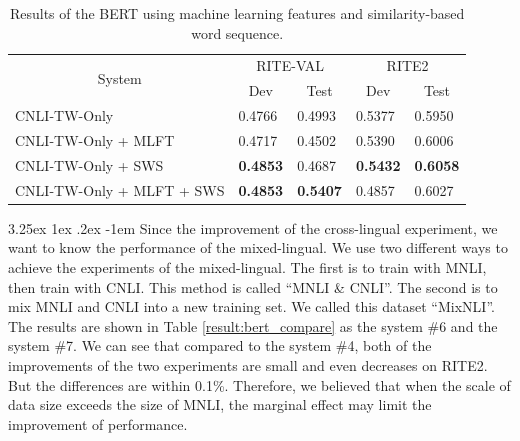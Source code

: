 \documentclass[12pt]{article}
\makeatletter
\renewcommand\paragraph{\@startsection{paragraph}{5}{\z@}%
  {3.25ex \@plus1ex \@minus.2ex}%
  {-1em}%
  {\normalfont\normalsize\bfseries}}
\makeatother
\begin{document}
\begin{CJK*}{UTF8}{bkai}
\begin{spacing}{1.77}
\begin{table}[H]
  \centering
  \setlength{\extrarowheight}{-3pt}
  \caption{Results of the BERT using machine learning features and similarity-based word sequence.}
  \label{result:bert_csa_mlft_comparison}
  \begin{tabular}{|l|l|l|l|l|}
  \hline
  \multicolumn{1}{|c|}{\multirow{2}{*}{System}} & \multicolumn{2}{c|}{RITE-VAL} & \multicolumn{2}{c|}{RITE2} \\ \cline{2-5}
  \multicolumn{1}{|c|}{} & \multicolumn{1}{c|}{Dev} & \multicolumn{1}{c|}{Test} & \multicolumn{1}{c|}{Dev} & \multicolumn{1}{c|}{Test} \\ \hline
  CNLI-TW-Only & 0.4766 & 0.4993 & 0.5377 & 0.5950 \\ \hline
  CNLI-TW-Only + MLFT & 0.4717 & 0.4502 & 0.5390 & 0.6006 \\ \hline
  CNLI-TW-Only + SWS & \textbf{0.4853} & 0.4687 & \textbf{0.5432} & \textbf{0.6058} \\ \hline
  CNLI-TW-Only + MLFT + SWS & \textbf{0.4853} & \textbf{0.5407} & 0.4857 & 0.6027 \\ \hline
  \end{tabular}
\end{table}

\paragraph{}
Since the improvement of the cross-lingual experiment, we want to know the performance of the mixed-lingual. We use two different ways to achieve the experiments of the mixed-lingual. The first is to train with MNLI, then train with CNLI. This method is called ``MNLI \& CNLI''. The second is to mix MNLI and CNLI into a new training set. We called this dataset ``MixNLI''. The results are shown in Table \ref{result:bert_compare} as the system \#6 and the system \#7. We can see that compared to the system \#4, both of the improvements of the two experiments are small and even decreases on RITE2. But the differences are within 0.1\%. Therefore, we believed that when the scale of data size exceeds the size of MNLI, the marginal effect may limit the improvement of performance.


\end{spacing}
\end{CJK*}
\end{document}
